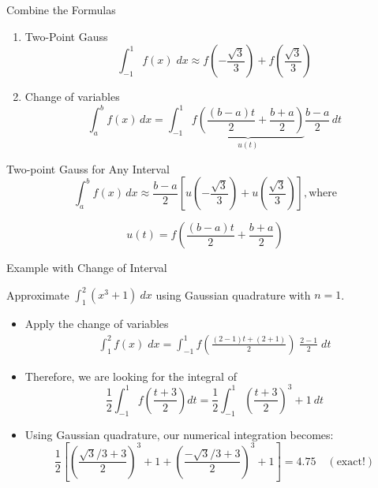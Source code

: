 \documentclass[10pt]{beamer}
\begin{document}
\begin{frame}{Combine the Formulas}

\begin{enumerate}

    \item Two-Point Gauss
    $$
      \int_{-1}^1 f(x) \; \mathit{dx} \approx f\left(-\frac{\sqrt{3}}{3}\right) + f\left(\frac{\sqrt{3}}{3} \right)
    $$
    \item Change of variables
    \begin{equation*}
    \int_a^b f(x)\,dx = \int_{-1}^{1}
    \underbrace{f\left(\frac{(b-a)t}{2}+\frac{b+a}{2}\right)}_{u(t)}\frac{b-a}{2}\,dt
\end{equation*}

\end{enumerate}


  \begin{block}{Two-point Gauss for Any Interval}
  \begin{equation*}
    \int_a^b f(x)\,dx \approx \frac{b-a}{2} \left[ u\left(-\frac{\sqrt{3}}{3}
  \right) + u\left(\frac{\sqrt{3}}{3}\right)\right], \text{where}
  \end{equation*}
  
  $$u(t) = f\left(\frac{(b-a)t}{2}+\frac{b+a}{2}\right)$$
\end{block}

\end{frame}


{ \logo{}
\begin{frame}{Example with Change of Interval}

\begin{example}
Approximate $\displaystyle \int_1^{2} (x^3 +1) ~dx$ using
Gaussian quadrature with $n=1$. \\
\end{example}

   \begin{itemize}
   
      \item Apply the change of variables
        \begin{eqnarray*}
          \int_1^{2} f(x) \; \mathit{dx} = \int_{-1}^1 f\left(\frac{(2-1)t+(2+1)}{2}\right) \;
          \frac{2-1}{2} \; \mathit{dt}
        \end{eqnarray*}

     \item Therefore, we are looking for the integral of
        $$\frac{1}{2}\int_{-1}^1 f\left(\frac{t+3}{2}\right) dt = 
        \frac{1}{2}\int_{-1}^1 \left(\frac{t+3}{2}\right)^3 + 1 ~dt
        $$

     \item Using Gaussian quadrature, our numerical integration becomes:
        $$\frac{1}{2}\left[
            \left(\frac{\sqrt{3}/3+3}{2}\right)^3 + 1
            + \left(\frac{-\sqrt{3}/3+3}{2}\right)^3 + 1
        \right] =
        4.75 \quad (\text{exact!})
        $$

   \end{itemize}
\end{frame}
}
\end{document}
